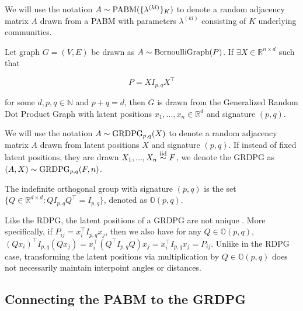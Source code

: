\documentclass[12pt]{article}
\begin{document}
We will use the notation \(A \sim \text{PABM}(\{\lambda^{(kl)}\}_K)\) to denote
a random adjacency matrix \(A\) drawn from a PABM with parameters
\(\lambda^{(kl)}\) consisting of \(K\) underlying communities.

\begin{definition}
\label{grdpg}
Let graph $G = (V, E)$ be drawn as $A \sim \text{BernoulliGraph}(P)$.
If $\exists X \in \mathbb{R}^{n \times d}$ such that

\begin{equation} \label{eq:grdpg}
  P = X I_{p,q} X^\top
\end{equation}

for some $d, p, q \in \mathbb{N}$ and $p + q = d$, then
$G$ is drawn from the Generalized Random Dot Product Graph with latent positions $x_1, ..., x_n \in \mathbb{R}^d$ and signature $(p, q)$.
\end{definition}

We will use the notation \(A \sim \text{GRDPG}_{p,q}(X)\) to denote a random
adjacency matrix \(A\) drawn from latent positions \(X\) and signature
\((p, q)\). If instead of fixed latent positions, they are drawn $X_1, ..., X_n \stackrel{\text{iid}}{\sim} F$, we denote the GRDPG as $(A, X) \sim \text{GRDPG}_{p,q}(F, n)$.

\begin{definition}
The indefinite orthogonal group with signature $(p, q)$ is
the set $\{Q \in \mathbb{R}^{d \times d} : Q I_{p, q} Q^{\top} = I_{p, q}\}$,
denoted as $\mathbb{O}(p, q)$.
\end{definition}

\begin{remark}
Like the RDPG, the latent positions of a GRDPG are not unique
\cite{rubindelanchy2017statistical}.
More specifically, if $P_{ij} = x_i^\top I_{p, q} x_j$, then we also have for any
$Q \in \mathbb{O}(p, q)$,
$(Q x_i)^\top I_{p, q} (Q x_j) = x_i^\top (Q^\top I_{p, q} Q) x_j =
x_i^\top I_{p, q} x_j = P_{ij}$.
Unlike in the RDPG case, transforming the latent positions via multiplication
by $Q \in \mathbb{O}(p, q)$ does not necessarily maintain interpoint angles or
distances.
\end{remark}

\hypertarget{connecting-the-pabm-to-the-grdpg}{%
\subsection{Connecting the PABM to the
GRDPG}\label{connecting-the-pabm-to-the-grdpg}}
\end{document}
